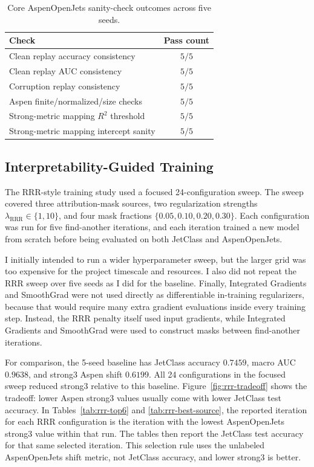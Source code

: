 \begin{table}[t]
\centering
\caption{Core AspenOpenJets sanity-check outcomes across five seeds.}
\label{tab:aspen-sanity}
\begin{tabular}{lc}
\toprule
Check & Pass count \\
\midrule
Clean replay accuracy consistency & $5/5$ \\
Clean replay AUC consistency & $5/5$ \\
Corruption replay consistency & $5/5$ \\
Aspen finite/normalized/size checks & $5/5$ \\
Strong-metric mapping $R^2$ threshold & $5/5$ \\
Strong-metric mapping intercept sanity & $5/5$ \\
\bottomrule
\end{tabular}
\end{table}

\subsection{Interpretability-Guided Training}

The RRR-style training study used a focused 24-configuration sweep. The sweep covered three attribution-mask sources, two regularization strengths $\lambda_{\mathrm{RRR}}\in\{1,10\}$, and four mask fractions $\{0.05,0.10,0.20,0.30\}$. Each configuration was run for five find-another iterations, and each iteration trained a new model from scratch before being evaluated on both JetClass and AspenOpenJets.

I initially intended to run a wider hyperparameter sweep, but the larger grid was too expensive for the project timescale and resources. I also did not repeat the RRR sweep over five seeds as I did for the baseline. Finally, Integrated Gradients and SmoothGrad were not used directly as differentiable in-training regularizers, because that would require many extra gradient evaluations inside every training step. Instead, the RRR penalty itself used input gradients, while Integrated Gradients and SmoothGrad were used to construct masks between find-another iterations.

For comparison, the 5-seed baseline has JetClass accuracy $0.7459$, macro AUC $0.9638$, and strong3 Aspen shift $0.6199$. All 24 configurations in the focused sweep reduced strong3 relative to this baseline. Figure~\ref{fig:rrr-tradeoff} shows the tradeoff: lower Aspen strong3 values usually come with lower JetClass test accuracy. In Tables~\ref{tab:rrr-top6} and \ref{tab:rrr-best-source}, the reported iteration for each RRR configuration is the iteration with the lowest AspenOpenJets strong3 value within that run. The tables then report the JetClass test accuracy for that same selected iteration. This selection rule uses the unlabeled AspenOpenJets shift metric, not JetClass accuracy, and lower strong3 is better.

